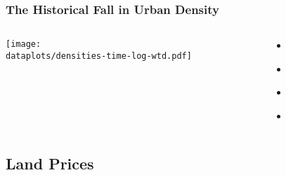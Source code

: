 \documentclass[aspectratio=169]{beamer}
\begin{document}

\begin{frame}[label=density]
\frametitle{The Historical Fall in Urban Density}
\begin{columns}
\begin{column}{0.9\textwidth}
\texttt{[image: \\dataplots/densities-time-log-wtd.pdf]}
\end{column}
\begin{column}{0.2\textwidth}
\begin{itemize}
\item[] \hyperlink{Paris}{}
\item[] \hyperlink{violins}{}
\item[] \hyperlink{Top5}{}
\item[] \hyperlink{world_sample_city}{}
\end{itemize}
\end{column}

\end{columns}
\end{frame}



\subsection{Land Prices}


\end{document}
